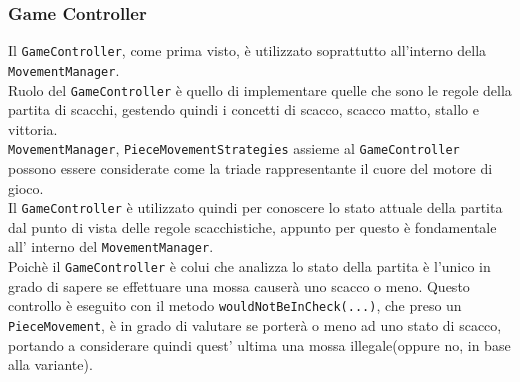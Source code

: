 \documentclass[a4paper,12pt]{report}
\begin{document}
\subsubsection{Game Controller}

Il \texttt{GameController}, come prima visto, è utilizzato soprattutto all'interno della \texttt{MovementManager}.
\\
Ruolo del \texttt{GameController} è quello di implementare quelle che sono le regole della partita di scacchi, gestendo quindi i concetti di scacco, scacco matto, stallo e vittoria.
\\
\texttt{MovementManager}, \texttt{PieceMovementStrategies} assieme al \texttt{GameController} possono essere considerate come la triade rappresentante il cuore del motore di gioco.
\\
Il \texttt{GameController} è utilizzato quindi per conoscere lo stato attuale della partita dal punto di vista delle regole scacchistiche, appunto per questo è fondamentale all' interno del \texttt{MovementManager}.
\\
Poichè il \texttt{GameController} è colui che analizza lo stato della partita è l'unico in grado di sapere se effettuare una mossa causerà uno scacco o meno. Questo controllo è eseguito con il metodo \texttt{wouldNotBeInCheck(...)}, che preso un \texttt{PieceMovement}, è in grado di valutare se porterà o meno ad uno stato di scacco, portando a considerare quindi quest' ultima una mossa illegale(oppure no, in base alla variante).
\end{document}
